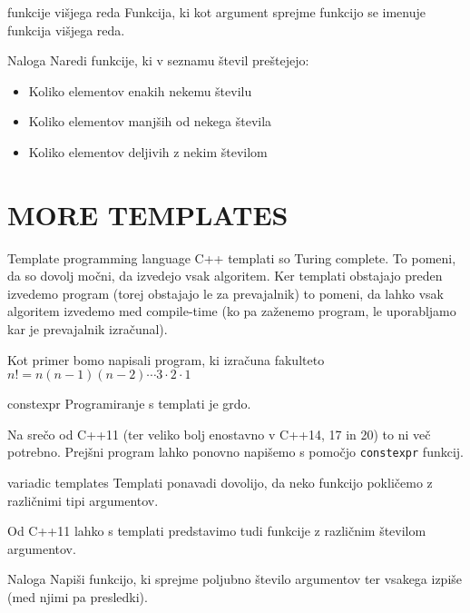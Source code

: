 \documentclass{beamer}
\begin{document}
\begin{frame}{funkcije višjega reda}
  Funkcija, ki kot argument sprejme funkcijo se imenuje funkcija višjega reda.
\end{frame}

\begin{frame}{Naloga}
  Naredi funkcije, ki v seznamu števil preštejejo:
  \begin{itemize}
  \item Koliko elementov enakih nekemu številu
  \item Koliko elementov manjših od nekega števila
  \item Koliko elementov deljivih z nekim številom
  \end{itemize}
\end{frame}

\section{MORE TEMPLATES}
\begin{frame}{Template programming language}
  C++ templati so Turing complete. To pomeni, da so dovolj močni, da izvedejo vsak algoritem. Ker templati obstajajo preden izvedemo program (torej obstajajo le za prevajalnik) to pomeni, da lahko vsak algoritem izvedemo med compile-time (ko pa zaženemo program, le uporabljamo kar je prevajalnik izračunal).

  Kot primer bomo napisali program, ki izračuna fakulteto \(n! = n(n-1)(n-2)\cdots3\cdot2\cdot1\)
\end{frame}
\begin{frame}{constexpr}
  Programiranje s templati je grdo.\pause{}
  
  Na srečo od C++11 (ter veliko bolj enostavno v C++14, 17 in 20) to ni več potrebno. Prejšni program lahko ponovno napišemo s pomočjo \texttt{constexpr} funkcij.
\end{frame}

\begin{frame}{variadic templates}
  Templati ponavadi dovolijo, da neko funkcijo pokličemo z različnimi tipi argumentov.

  Od C++11 lahko s templati predstavimo tudi funkcije z različnim številom argumentov.
\end{frame}

\begin{frame}{Naloga}
  Napiši funkcijo, ki sprejme poljubno število argumentov ter vsakega izpiše (med njimi pa presledki).
\end{frame}
\end{document}
